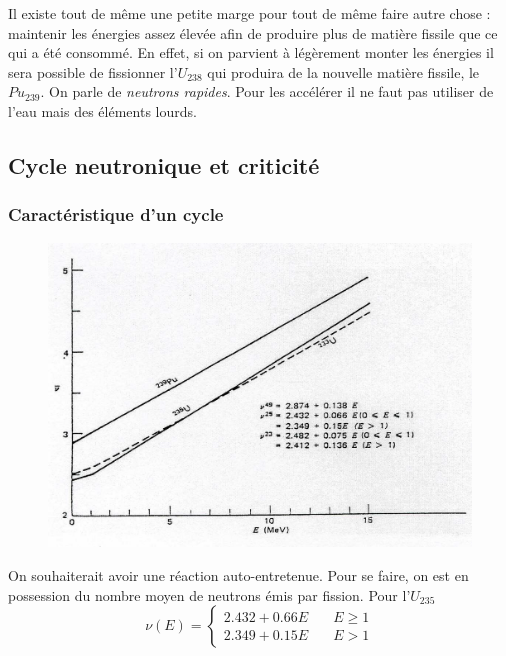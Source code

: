 Il existe tout de même une petite marge pour tout de même faire autre chose : maintenir les énergies 
assez élevée afin de produire plus de matière fissile que ce qui a été consommé. En effet, si on 
parvient à légèrement monter les énergies il sera possible de fissionner l'$U_{238}$ qui produira 
de la nouvelle matière fissile, le $Pu_{239}$. On parle de \textit{neutrons rapides}. Pour les 
accélérer il ne faut pas utiliser de l'eau mais des éléments lourds.



\subsection{Cycle neutronique et criticité}
\subsubsection{Caractéristique d'un cycle}
	\begin{figure}
	\vspace{-5mm}
	\includegraphics[scale=0.13]{ch1/image6.png}
	\end{figure}
On souhaiterait avoir une réaction auto-entretenue. Pour se faire, on est en possession du nombre 
moyen de neutrons émis par fission. Pour l'$U_{235}$
\begin{equation}
\nu(E) = \left\{\begin{array}{ll}
2.432 +0.66E&\quad E\geq 1\\
2.349+0.15E&\quad E>1
\end{array}\right.
\end{equation}

